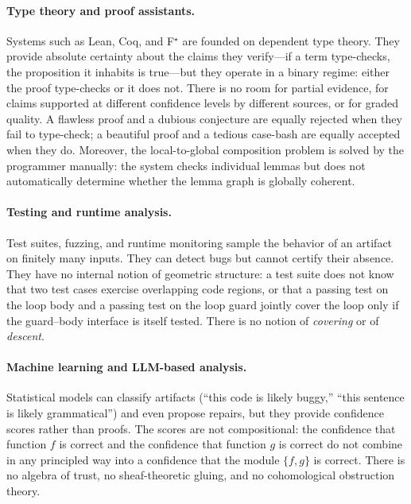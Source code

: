 \paragraph{Type theory and proof assistants.}
Systems such as Lean, Coq, and F$^\star$ are founded on dependent type
theory.  They provide absolute certainty about the claims they
verify---if a term type-checks, the proposition it inhabits is
true---but they operate in a binary regime: either the proof
type-checks or it does not.  There is no room for partial evidence,
for claims supported at different confidence levels by different
sources, or for graded quality.  A flawless proof and a dubious
conjecture are equally rejected when they fail to type-check; a
beautiful proof and a tedious case-bash are equally accepted when they
do.  Moreover, the local-to-global composition problem is solved by
the programmer manually: the system checks individual lemmas but does
not automatically determine whether the lemma graph is globally
coherent.

\paragraph{Testing and runtime analysis.}
Test suites, fuzzing, and runtime monitoring sample the behavior of an
artifact on finitely many inputs.  They can detect bugs but cannot
certify their absence.  They have no internal notion of geometric
structure: a test suite does not know that two test cases exercise
overlapping code regions, or that a passing test on the loop body and
a passing test on the loop guard jointly cover the loop only if the
guard--body interface is itself tested.  There is no notion of
\emph{covering} or of \emph{descent}.

\paragraph{Machine learning and LLM-based analysis.}
Statistical models can classify artifacts (``this code is likely
buggy,'' ``this sentence is likely grammatical'') and even propose
repairs, but they provide confidence scores rather than proofs.  The
scores are not compositional: the confidence that function $f$ is
correct and the confidence that function $g$ is correct do not combine
in any principled way into a confidence that the module $\{f, g\}$ is
correct.  There is no algebra of trust, no sheaf-theoretic gluing, and
no cohomological obstruction theory.

\medskip

